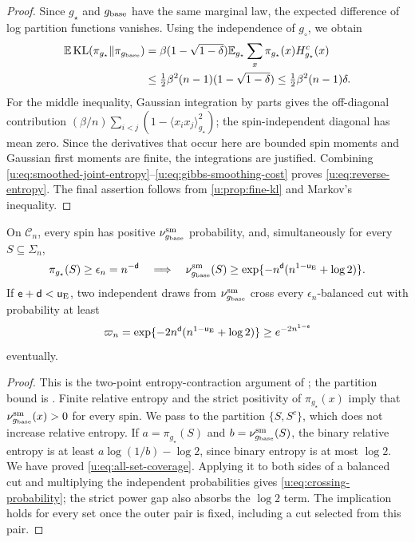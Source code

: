 \begin{proof}
Since $g_\star$ and $g_{\rm base}$ have the same marginal law, the expected
difference of log partition functions vanishes. Using the independence of
$g_\circ$, we obtain
\begin{equation}\label{u:eq:gibbs-smoothing-cost}
 \begin{split}
 \mathbb E\operatorname{KL}(\pi_{g_\star}\Vert\pi_{g_{\rm base}})
 &=\beta(1-\sqrt{1-\delta})
   \mathbb E_{g_\star}\sum_x\pi_{g_\star}(x)H^c_{g_\star}(x)\\
 &\le\tfrac12\beta^2(n-1)(1-\sqrt{1-\delta})
 \le\tfrac12\beta^2(n-1)\delta.
 \end{split}
\end{equation}
For the middle inequality, Gaussian integration by parts gives the
off-diagonal contribution
$(\beta/n)\sum_{i<j}(1-\langle x_ix_j\rangle_{g_\star}^2)$;
the spin-independent diagonal has mean zero. Since the derivatives that occur here are bounded spin moments and
Gaussian first moments are finite, the integrations are justified. Combining \eqref{u:eq:smoothed-joint-entropy}--\eqref{u:eq:gibbs-smoothing-cost}
proves \eqref{u:eq:reverse-entropy}. The final assertion follows from
\cref{u:prop:fine-kl} and Markov's inequality.
\end{proof}

\begin{lemma}\label{u:lem:coverage}
On $\mathcal C_n$, every spin has positive
$\nu^{\rm sm}_{g_{\rm base}}$ probability, and, simultaneously for every
$S\subseteq\Sigma_n$,
\begin{equation}\label{u:eq:all-set-coverage}
 \pi_{g_\star}(S)\ge\epsilon_n=n^{-\mathsf{d}}
 \quad\Longrightarrow\quad
 \nu^{\rm sm}_{g_{\rm base}}(S)
 \ge\exp\{-n^{\mathsf{d}}(n^{1-\mathsf{u}_{\rm E}}+\log2)\}.
\end{equation}
If $\mathsf{e}+\mathsf{d}<\mathsf{u}_{\rm E}$, two independent draws from
$\nu^{\rm sm}_{g_{\rm base}}$ cross every $\epsilon_n$-balanced cut with
probability at least
\begin{equation}\label{u:eq:crossing-probability}
 \varpi_n=\exp\{-2n^{\mathsf{d}}(n^{1-\mathsf{u}_{\rm E}}+\log2)\}
                       \ge e^{-2n^{1-\mathsf{e}}}
\end{equation}
eventually.
\end{lemma}

\begin{proof}
This is the two-point entropy-contraction argument of
\cite[Section~5, Proposition~6]{oai-typical-upper}; the partition bound
is \cite[Theorem~4.20]{boucheron-lugosi-massart-2013}.
Finite relative entropy and the strict positivity of $\pi_{g_\star}(x)$
imply that $\nu^{\rm sm}_{g_{\rm base}}(x)>0$ for every spin. We pass to the partition $\{S,S^c\}$, which does not increase relative
entropy. If $a=\pi_{g_\star}(S)$ and
$b=\nu^{\rm sm}_{g_{\rm base}}(S)$, the binary relative entropy is at least
$a\log(1/b)-\log2$, since binary entropy is at most $\log2$.
We have proved \eqref{u:eq:all-set-coverage}. Applying it to both sides
of a balanced cut and multiplying the independent probabilities gives
\eqref{u:eq:crossing-probability}; the strict power gap also absorbs the
$\log2$ term. The implication holds for every set once the outer pair is
fixed, including a cut selected from this pair.
\end{proof}

